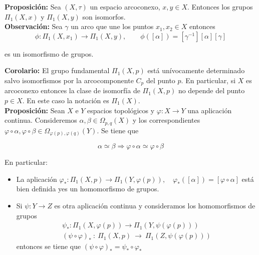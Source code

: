 \documentclass{article}
\begin{document}
\textbf{Proposición:} Sea $(X,\tau)$ un espacio arcoconexo, $x,y\in X$. Entonces los grupos $\Pi_1(X,x)$ y $\Pi_1(X,y)$ son isomorfos.\\

\textbf{Observación:} Sea $\gamma$ un arco que une los puntos $x_1,x_2\in X$ entonces 
\begin{equation*}
\phi:\Pi_1(X,x_1)\rightarrow \Pi_1(X,y),\qquad \phi([\alpha])=[\gamma^{-1}][\alpha][\gamma]
\end{equation*}

es un isomorfismo de grupos. 

\textbf{Corolario:} El grupo fundamental $\Pi_1(X,p)$ está unívocamente determinado salvo isomorfismos por la arcocomponente $C_p$ del punto $p$. En particular, si $X$ es arcoconexo entonces la clase de isomorfía de $\Pi_1(X,p)$ no depende del punto $p\in X$. En este caso la notación es $\Pi_1(X)$. \\

\textbf{Proposición:} Sean $X$ e $Y$ espacios topológicos y $\varphi:X\rightarrow Y$ una aplicación continua. Consideremos $\alpha,\beta\in \Omega_{p,q}(X)$ y los correspondientes $\varphi\circ\alpha,\varphi\circ\beta\in \Omega_{\varphi(p),\varphi(q)}(Y)$. Se tiene que

\begin{equation*}
\alpha\simeq \beta \Rightarrow \varphi\circ \alpha \simeq \varphi\circ\beta
\end{equation*}

En particular:
\begin{itemize}
\item La aplicación $\varphi_*:\Pi_1(X,p)\rightarrow \Pi_1(Y,\varphi(p)),\quad\varphi_*([\alpha])=[\varphi\circ\alpha]$ está bien definida yes un homomorfismo de grupos.

\item Si $\psi:Y\rightarrow Z$ es otra aplicación continua y consideramos los homomorfismos de grupos 
\begin{gather*}
\psi_*:\Pi_1(X,\varphi(p))\rightarrow \Pi_1(Y,\psi(\varphi(p)))\\(\psi\circ\varphi)_*~:~\Pi_1(X,p)~\rightarrow~\Pi_1(Z,\psi(\varphi(p)))
\end{gather*}
entonces se tiene que $(\psi\circ\varphi)_*=\psi_*\circ\varphi_*$
\end{itemize}
\end{document}
